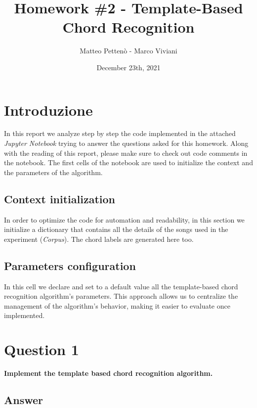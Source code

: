 \documentclass{article}
\title{Homework \#2 - Template-Based Chord Recognition} %
\author{Matteo Pettenò - Marco Viviani} %
\date{December 23th, 2021} %
\institute{Politecnico di Milano} %
\begin{document}
\maketitle %



\section*{Introduzione}

In this report we analyze step by step the code implemented in the attached \emph{Jupyter Notebook} trying to answer the questions asked for this homework. Along with the reading of this report, please make sure to check out code comments in the notebook. The first cells of the notebook are used to initialize the context and the parameters of the algorithm.

\subsection*{Context initialization}
In order to optimize the code for automation and readability, in this section we initialize a dictionary that contains all the details of the songs used in the experiment (\emph{Corpus}). The chord labels are generated here too.

\subsection*{Parameters configuration}
In this cell we declare and set to a default value all the template-based chord recognition algorithm's parameters. This approach allows us to centralize the management of the algorithm's behavior, making it easier to evaluate once implemented.

\section*{\color{red}Question 1}

\begin{problem}
	\textbf{Implement the template based chord recognition algorithm.}
\end{problem}

\subsection*{\color{blue}Answer}
\end{document}
